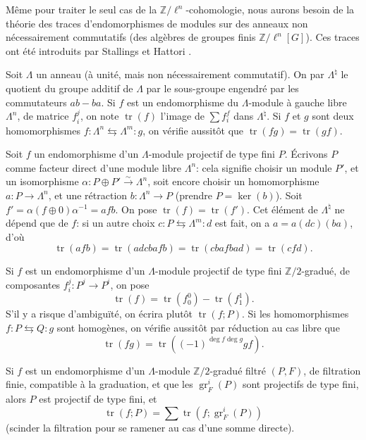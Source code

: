 \documentclass{book}
\DeclareMathOperator{\gr}{gr}
\DeclareMathOperator{\tr}{tr}
\newcommand{\dZ}{\mathbb{Z}}
\newcommand{\iso}{\xrightarrow\sim}
\begin{document}
Même pour traiter le seul cas de la $\dZ/\ell^n$-cohomologie, nous aurons 
besoin de la théorie des traces d'endomorphismes de modules sur des anneaux 
non nécessairement commutatifs (des algèbres de groupes finis 
$\dZ/\ell^n[G]$). Ces traces ont été introduits par Stallings et Hattori 
\cite{II:B}. 

Soit $\Lambda$ un anneau (à unité, mais non nécessairement commutatif). 
On par $\Lambda^\natural$ le quotient du groupe additif de $\Lambda$ par le 
sous-groupe engendré par les commutateurs $a b - b a$. Si $f$ est un 
endomorphisme du $\Lambda$-module à gauche libre $\Lambda^n$, de matrice 
$f_i^j$, on note $\tr(f)$ l'image de $\sum f_i^f$ dans $\Lambda^\natural$. 
Si $f$ et $g$ sont deux homomorphismes 
$f:\Lambda^n \leftrightarrows \Lambda^m : g$, on vérifie aussitôt que 
$\tr(f g) = \tr(g f)$. 

Soit $f$ un endomorphisme d'un $\Lambda$-module projectif de type fini $P$. 
Écrivons $P$ comme facteur direct d'une module libre $\Lambda^n$: cela signifie 
choisir un module $P'$, et un isomorphisme $\alpha:P\oplus P'\iso \Lambda^n$, 
soit encore choisir un homomorphisme $a:P\to \Lambda^n$, et une rétraction 
$b:\Lambda^n\to P$ (prendre $P=\ker(b)$). Soit 
$f'=\alpha(f\oplus 0)\alpha^{-1} =af b$. On pose $\tr(f) = \tr(f')$. Cet 
élément de $\Lambda^\natural$ ne dépend que de $f$: si un autre choix 
$c:P\leftrightarrows \Lambda^m:d$ est fait, on a $a=a(dc)(ba)$, d'où 
\[
 \tr(a f b) = \tr(adcbafb) = \tr(cbafbad) = \tr(cfd) \text{.}
\]

Si $f$ est un endomorphisme d'un $\Lambda$-module projectif de type fini 
$\dZ/2$-gradué, de composantes $f_i^j:P^j\to P^i$, on pose 
\[
  \tr(f) = \tr(f_0^0) - \tr(f_1^1) \text{.}
\]
S'il y a risque d'ambiguïté, on écrira plutôt $\tr(f;P)$. Si les 
homomorphismes $f:P\leftrightarrows Q:g$ sont homogènes, on vérifie 
aussitôt par réduction au cas libre que 
\begin{equation}\label{II:eq:5}
  \tr(f g) = \tr\left((-1)^{\deg f \deg g} g f\right) \text{.}
\end{equation}

Si $f$ est un endomorphisme d'un $\Lambda$-module $\dZ/2$-gradué filtré 
$(P,F)$, de filtration finie, compatible à la graduation, et que les 
$\gr_F^i(P)$ sont projectifs de type fini, alors $P$ est projectif de type 
fini, et 
\begin{equation}\label{II:eq:6}
  \tr(f;P) = \sum \tr\left(f; \gr_F^i(P) \right)
\end{equation}
(scinder la filtration pour se ramener au cas d'une somme directe). 
\end{document}
